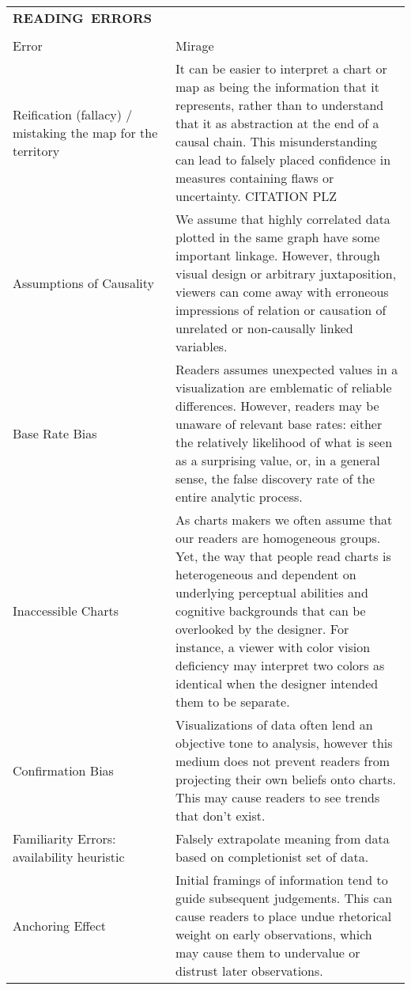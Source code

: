 \begin{longtable}{p{3cm}p{14cm}}
  \\\hbox{\normalsize{\textbf{READING ERRORS}}}&\\ \\
  \normalsize{Error} & \normalsize{Mirage}\\ \hline
   \rowcolor{colord}Reification (fallacy) / mistaking the map for the territory  & It can be easier to interpret a chart or map as being the information that it represents, rather than to understand that it as abstraction at the end of a causal chain. This misunderstanding can lead to falsely placed confidence in measures containing flaws or uncertainty.  CITATION PLZ\\
 \rowcolor{colord-opaque}Assumptions of Causality & We assume that highly correlated data plotted in the same graph have some important linkage. However, through visual design or arbitrary juxtaposition, viewers can come away with erroneous impressions of relation or causation of unrelated or non-causally linked variables. \cite{xiong2019illusion, few2019loom}\\
 \rowcolor{colord}Base Rate Bias & Readers assumes unexpected values in a visualization are emblematic of reliable differences. However, readers may be unaware of relevant base rates: either the relatively likelihood of what is seen as a surprising value, or, in a general sense, the false discovery rate of the entire analytic process.  \cite{correll2016surprise,pu2018garden, zgraggen2018investigating}\\
 \rowcolor{colord-opaque}Inaccessible Charts & As charts makers we often assume that our readers are homogeneous groups. Yet, the way that people read charts is heterogeneous and dependent on underlying perceptual abilities and cognitive backgrounds that can be overlooked by the designer. For instance, a viewer with color vision deficiency may interpret two colors as identical when the designer intended them to be separate. \cite{lundgard2019Sociotechnical, plaisant2005information}\\
 \rowcolor{colord}Confirmation Bias & Visualizations of data often lend an objective tone to analysis, however this medium does not prevent readers from projecting their own beliefs onto charts. This may cause readers to see trends that don't exist. \cite{valdez2017framework, few2019loom}\\
 \rowcolor{colord-opaque}Familiarity Errors: availability heuristic & Falsely extrapolate meaning from data based on completionist set of data. \cite{few2019loom}\\
 \rowcolor{colord}Anchoring Effect  & Initial framings of information tend to guide subsequent judgements. This can cause readers to place undue rhetorical weight on early observations, which may cause them to undervalue or distrust later observations.  \cite{ritchie2019lie, hullman2011visualization}\\

\end{longtable}

